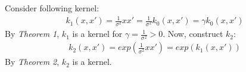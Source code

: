 \documentclass{article}
\begin{document}
    Consider following kernel:
    \begin{gather}
        k_1(x, x') = \frac{1}{\sigma^2} xx' = \frac{1}{\sigma^2} k_0(x, x') = \gamma k_0(x, x')
    \end{gather}
    By \textit{Theorem 1}, $k_1$ is a kernel for $\gamma = \frac{1}{\sigma^2} > 0$.
    Now, construct $k_2$:
    \begin{gather}
        k_2(x, x') = exp(\frac{1}{\sigma^2} xx') = exp(k_1(x, x'))
    \end{gather}
    By \textit{Theorem 2}, $k_2$ is a kernel.
\end{document}
